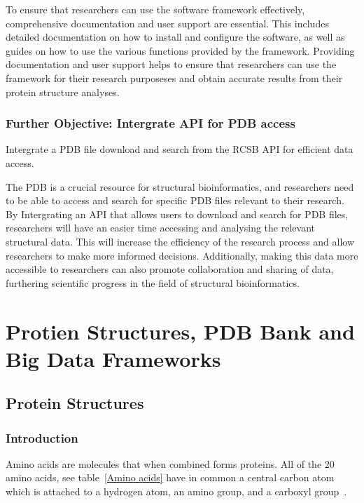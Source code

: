 \documentclass[]{final_report}
\begin{document}
To ensure that researchers can use the software framework effectively, comprehensive documentation and user support are essential. This includes detailed documentation on how to install and configure the software, as well as guides on how to use the various functions provided by the framework. Providing documentation and user support helps to ensure that researchers can use the framework for their research purposeses and obtain accurate results from their protein structure analyses.

\subsubsection{Further Objective: Intergrate API for PDB access}

\begin{displayquote}
    Intergrate a PDB file download and search from the RCSB API for efficient data access.
\end{displayquote}

The PDB is a crucial resource for structural bioinformatics, and researchers need to be able to access and search for specific PDB files relevant to their research. By Intergrating an API that allows users to download and search for PDB files, researchers will have an easier time accessing and analysing the relevant structural data. This will increase the efficiency of the research process and allow researchers to make more informed decisions. Additionally, making this data more accessible to researchers can also promote collaboration and sharing of data, furthering scientific progress in the field of structural bioinformatics.

\clearpage


\section{Protien Structures, PDB Bank and Big Data Frameworks}
\subsection{Protein Structures}
\subsubsection{Introduction}

Amino acids are molecules that when combined forms proteins. All of the 20 amino acids, see table~\ref{Amino acids} have in common a central carbon atom which is attached to a hydrogen atom, an amino group, and a carboxyl group~\cite{branden_introduction_1998}.
\end{document}
